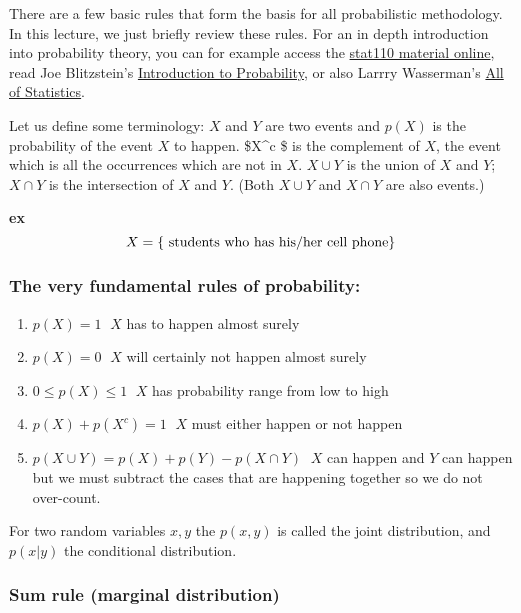 \documentclass[11pt]{article}
\begin{document}
There are a few basic rules that form the basis for all probabilistic
methodology. In this lecture, we just briefly review these rules. For an
in depth introduction into probability theory, you can for example
access the \href{http://projects.iq.harvard.edu/stat110/youtube}{stat110
material online}, read Joe Blitzstein's
\href{http://www.amazon.com/gp/product/1466575573/ref=as_li_tl?ie=UTF8\&camp=1789\&creative=390957\&creativeASIN=1466575573\&linkCode=as2}{Introduction
to Probability}, or also Larrry Wasserman's
\href{http://www.amazon.com/All-Statistics-Statistical-Inference-Springer/dp/0387402721}{All
of Statistics}.

Let us define some terminology: \(X\) and \(Y\) are two events and
\(p(X)\) is the probability of the event \(X\) to happen. \$X\^{}c \$ is
the complement of \(X\), the event which is all the occurrences which
are not in \(X\). \(X \cup Y\) is the union of \(X\) and \(Y\);
\(X \cap Y\) is the intersection of \(X\) and \(Y\). (Both \(X \cup Y\)
and \(X\cap Y\) are also events.)

\textbf{ex} \[X = \{ \hbox{ students who has his/her cell phone} \}\]

\subsubsection{The very fundamental rules of
probability:}\label{the-very-fundamental-rules-of-probability}

\begin{enumerate}
\def\labelenumi{\arabic{enumi}.}
\item
  \(p(X) = 1 \;\) \(X\) has to happen almost surely
\item
  \(p(X) = 0 \;\) \(X\) will certainly not happen almost surely
\item
  \(0 ≤ p(X) ≤ 1 \;\) \(X\) has probability range from low to high
\item
  \(p(X)+p(X^c)=1 \;\) \(X\) must either happen or not happen
\item
  \(p(X \cup Y)=p(X)+p(Y)−p(X \cap Y) \;\) \(X\) can happen and \(Y\)
  can happen but we must subtract the cases that are happening together
  so we do not over-count.
\end{enumerate}

    For two random variables \(x,y\) the \(p(x,y)\) is called the joint
distribution, and \(p(x|y)\) the conditional distribution.

\subsubsection{Sum rule (marginal
distribution)}\label{sum-rule-marginal-distribution}
\end{document}
